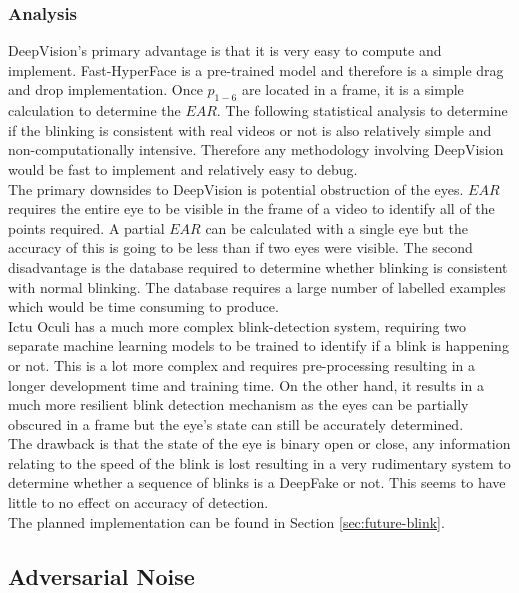 \documentclass{article}
\begin{document}
\subsubsection{Analysis}

DeepVision's primary advantage is that it is very easy to compute and implement. Fast-HyperFace is a pre-trained model and therefore is a simple drag and drop implementation. Once $p_{1-6}$ are located in a frame, it is a simple calculation to determine the $EAR$. The following statistical analysis to determine if the blinking is consistent with real videos or not is also relatively simple and non-computationally intensive. Therefore any methodology involving DeepVision would be fast to implement and relatively easy to debug.\\

The primary downsides to DeepVision is potential obstruction of the eyes. $EAR$ requires the entire eye to be visible in the frame of a video to identify all of the points required. A partial $EAR$ can be calculated with a single eye but the accuracy of this is going to be less than if two eyes were visible. The second disadvantage is the database required to determine whether blinking is consistent with normal blinking. The database requires a large number of labelled examples which would be time consuming to produce.\\

Ictu Oculi has a much more complex blink-detection system, requiring two separate machine learning models to be trained to identify if a blink is happening or not. This is a lot more complex and requires pre-processing resulting in a longer development time and training time. On the other hand, it results in a much more resilient blink detection mechanism as the eyes can be partially obscured in a frame but the eye's state can still be accurately determined.\\

The drawback is that the state of the eye is binary open or close, any information relating to the speed of the blink is lost resulting in a very rudimentary system to determine whether a sequence of blinks is a DeepFake or not. This seems to have little to no effect on accuracy of detection.\\

The planned implementation can be found in Section \ref{sec:future-blink}.

\subsection{Adversarial Noise}
\end{document}
